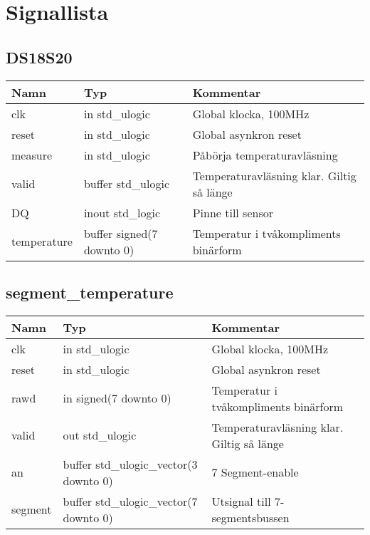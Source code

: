 \section{Signallista}
\subsection{DS18S20}\label{sec:sig:ds18s20}
\begin{table}[H]
	\begin{tabularx}{\textwidth}{p{2cm} p{4.3cm} X}
		\hline
		\textbf{Namn} & \textbf{Typ} & \textbf{Kommentar} \\
		\hline
		clk & in std\_ulogic & Global klocka, 100MHz \\
		reset & in std\_ulogic & Global asynkron reset \\
		measure & in std\_ulogic & Påbörja temperaturavläsning \\
		valid & buffer std\_ulogic & Temperaturavläsning klar. 
			Giltig så länge \signal{valid = '1'} \\
		DQ & inout std\_logic & Pinne till sensor \\
		temperature & buffer signed(7 downto 0) & Temperatur i tvåkompliments binärform \\
		\hline
	\end{tabularx}
\end{table}


\subsection{segment\_temperature}\label{sec:sig:segment}
\begin{table}[H]
	\begin{tabularx}{\textwidth}{p{2cm} p{4.3cm} X}
		\hline
		\textbf{Namn} & \textbf{Typ} & \textbf{Kommentar} \\
		\hline
		clk & in std\_ulogic & Global klocka, 100MHz \\
		reset & in std\_ulogic & Global asynkron reset \\
		rawd & in signed(7 downto 0) & Temperatur i tvåkompliments binärform \\
		valid & out std\_ulogic & Temperaturavläsning klar. 
			Giltig så länge \signal{valid = '1'} \\
		an & buffer std\_ulogic\_vector(3 downto 0) & 7 Segment-enable \\
		segment & buffer std\_ulogic\_vector(7 downto 0) & Utsignal till 7-segmentsbussen \\
		\hline
	\end{tabularx}
\end{table}

